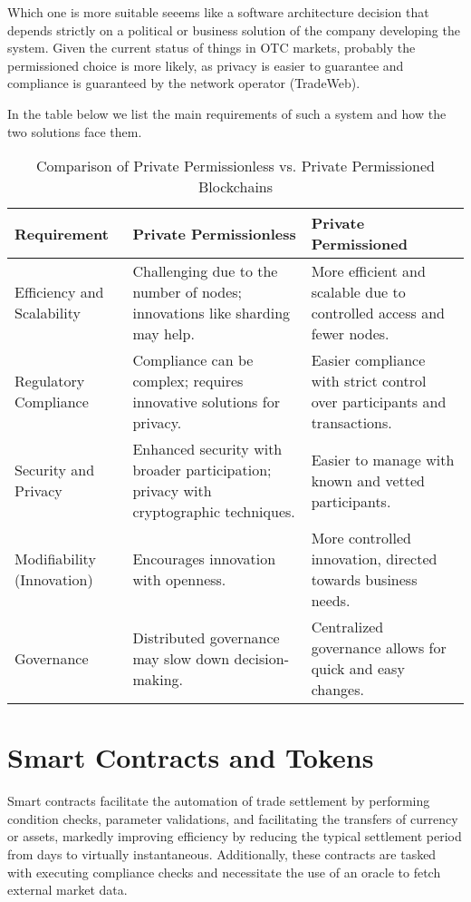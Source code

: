 \documentclass{article}
\begin{document}
Which one is more suitable seeems like a software architecture decision that depends strictly on a political or business solution of the company developing the system. Given the current status of things in OTC markets, probably the permissioned choice is more likely, as privacy is easier to guarantee and compliance is guaranteed by the network operator (TradeWeb).

In the table below we list the main requirements of such a system and how the two solutions face them.


\begin{table}[h]
    \centering
    \caption{Comparison of Private Permissionless vs. Private Permissioned Blockchains}
    \small %
    \begin{tabular}{>{\raggedright\arraybackslash}p{2.5cm} >{\raggedright\arraybackslash}p{4.5cm} >{\raggedright\arraybackslash}p{4.5cm}}
    \toprule
    \textbf{Requirement} & \textbf{Private Permissionless} & \textbf{Private Permissioned} \\
    \midrule
    Efficiency and Scalability & Challenging due to the number of nodes; innovations like sharding may help. & More efficient and scalable due to controlled access and fewer nodes. \\
    \midrule
    Regulatory Compliance & Compliance can be complex; requires innovative solutions for privacy. & Easier compliance with strict control over participants and transactions. \\
    \midrule
    Security and Privacy & Enhanced security with broader participation; privacy with cryptographic techniques. & Easier to manage with known and vetted participants. \\
    \midrule
    Modifiability (Innovation) & Encourages innovation with openness. & More controlled innovation, directed towards business needs. \\
    \midrule
    Governance & Distributed governance may slow down decision-making. & Centralized governance allows for quick and easy changes. \\
    \bottomrule
    \end{tabular}
    \end{table}
    

\section{Smart Contracts and Tokens}

Smart contracts facilitate the automation of trade settlement by performing condition checks, parameter validations, and facilitating the transfers of currency or assets, markedly improving efficiency by reducing the typical settlement period from days to virtually instantaneous. Additionally, these contracts are tasked with executing compliance checks and necessitate the use of an oracle to fetch external market data.
\end{document}
